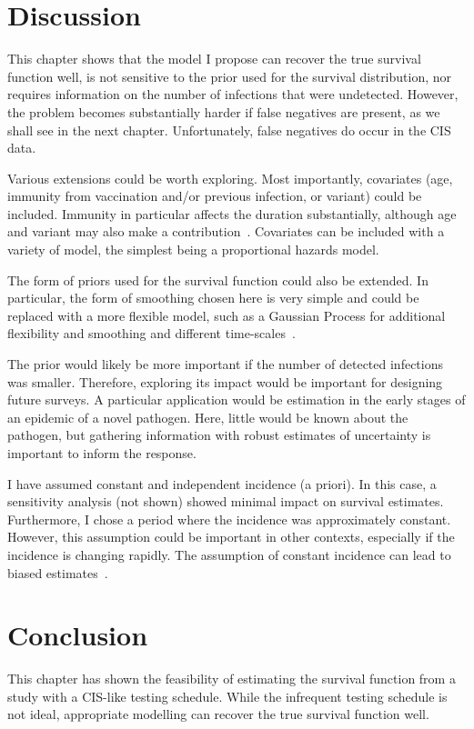 \documentclass[thesis.tex]{subfiles}
\begin{document}
\section{Discussion} \label{perf-test:sec:discussion}

This chapter shows that the model I propose can recover the true survival function well, is not sensitive to the prior used for the survival distribution, nor requires information on the number of infections that were undetected.
However, the problem becomes substantially harder if false negatives are present, as we shall see in the next chapter.
Unfortunately, false negatives do occur in the CIS data.

Various extensions could be worth exploring.
Most importantly, covariates (\eg age, immunity from vaccination and/or previous infection, or variant) could be included.
Immunity in particular affects the duration substantially, although age and variant may also make a contribution~\autocites{hakkiOnset}{russellWithinhost}.
Covariates can be included with a variety of model, the simplest being a proportional hazards model.

The form of priors used for the survival function could also be extended.
In particular, the form of smoothing chosen here is very simple and could be replaced with a more flexible model, such as a Gaussian Process for additional flexibility and smoothing and different time-scales~\autocite{saulGaussian}.

The prior would likely be more important if the number of detected infections was smaller.
Therefore, exploring its impact would be important for designing future surveys.
A particular application would be estimation in the early stages of an epidemic of a novel pathogen.
Here, little would be known about the pathogen, but gathering information with robust estimates of uncertainty is important to inform the response.

I have assumed constant and independent incidence (a priori).
In this case, a sensitivity analysis (not shown) showed minimal impact on survival estimates.
Furthermore, I chose a period where the incidence was approximately constant.
However, this assumption could be important in other contexts, especially if the incidence is changing rapidly.
The assumption of constant incidence can lead to biased estimates~\autocite{degruttolaAnalysis}.

\section{Conclusion} \label{perf-test:sec:conclusion}
This chapter has shown the feasibility of estimating the survival function from a study with a CIS-like testing schedule.
While the infrequent testing schedule is not ideal, appropriate modelling can recover the true survival function well.

\ifSubfilesClassLoaded{
  \listoftodos
}{}
\end{document}
